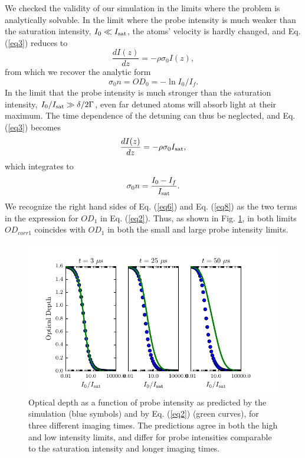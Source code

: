 \documentclass[12pt]{iopart}
\begin{document}
\par We checked the validity of our simulation in the limits where the problem is analytically solvable. In the limit where the probe intensity is much weaker than the saturation intensity, $I_0\ll I_{\rm{sat}}$, the atoms' velocity is hardly changed, and Eq.(\ref{eq3}) reduces to 
\begin{equation}
\frac{dI(z)}{dz}=-\rho\sigma_0 I(z),
\end{equation}
from which we recover the analytic form 
\begin{equation}
\sigma_0 n = OD_0 = -\ln I_0/I_f. \label{eq6}
\end{equation}
In the limit that the probe intensity is much stronger than the saturation intensity, $I_0/I_{\rm{sat}}\gg \delta/2\Gamma$, even far detuned atoms will absorb light at their maximum. The time dependence of the detuning can thus be neglected, and Eq. (\ref{eq3}) becomes 
\begin{equation}
\frac{dI(z)}{dz}=-\rho\sigma_0 I_{\rm{sat}}, 
\end{equation}
which integrates to 
\begin{equation}
\sigma_0 n = \frac{I_0 - I_f}{I_{\rm{sat}}}. \label{eq8}
\end{equation}
We recognize the right hand sides of Eq. (\ref{eq6}) and Eq. (\ref{eq8}) as the two terms in the expression for $OD_1$ in Eq. (\ref{eq2}). Thus, as shown in  Fig. \ref{fig:IsatLimits}, in both limits $OD_{corr1}$  coincides with $OD_1$ in both the small and large probe intensity limits. 
\begin{figure}
	\includegraphics{figure3.pdf}
\caption{Optical depth as a function of probe intensity as predicted by the simulation (blue symbols) and by Eq. (\ref{eq2}) (green curves), for three different imaging times. The predictions agree in both the high and low intensity limits, and differ for probe intensities comparable to the saturation intensity and longer imaging times. }  
\label{fig:IsatLimits}
\end{figure}
\end{document}
